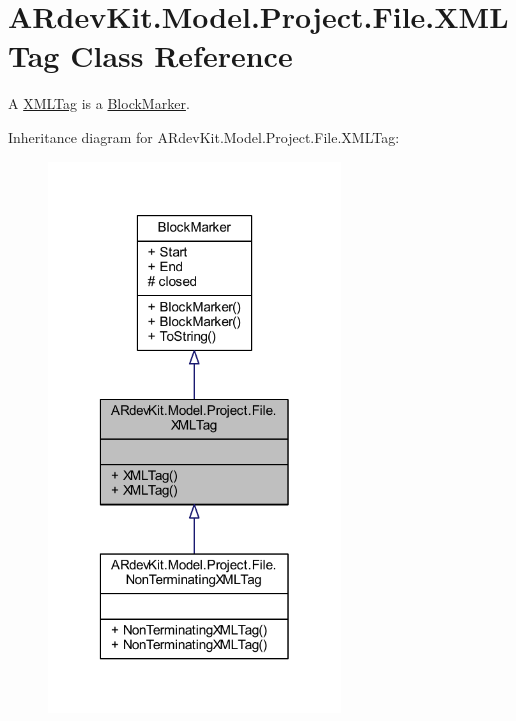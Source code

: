 \hypertarget{class_a_rdev_kit_1_1_model_1_1_project_1_1_file_1_1_x_m_l_tag}{\section{A\-Rdev\-Kit.\-Model.\-Project.\-File.\-X\-M\-L\-Tag Class Reference}
\label{class_a_rdev_kit_1_1_model_1_1_project_1_1_file_1_1_x_m_l_tag}
}


A \hyperlink{class_a_rdev_kit_1_1_model_1_1_project_1_1_file_1_1_x_m_l_tag}{X\-M\-L\-Tag} is a \hyperlink{class_a_rdev_kit_1_1_model_1_1_project_1_1_file_1_1_block_marker}{Block\-Marker}.  




Inheritance diagram for A\-Rdev\-Kit.\-Model.\-Project.\-File.\-X\-M\-L\-Tag\-:
\nopagebreak
\begin{figure}[H]
\begin{center}
\leavevmode
\includegraphics[width=220pt]{class_a_rdev_kit_1_1_model_1_1_project_1_1_file_1_1_x_m_l_tag__inherit__graph}
\end{center}
\end{figure}


